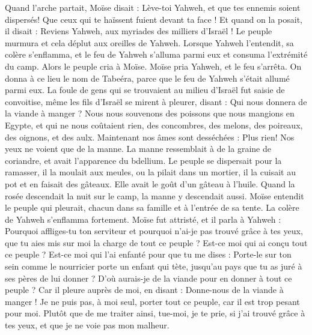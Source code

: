 \begin{multicols}{2}
Quand l'arche partait, Moïse disait : Lève-toi Yahweh, et que tes ennemis soient dispersés! Que ceux qui te haïssent fuient devant ta face !
Et quand on la posait, il disait : Reviens Yahweh, aux myriades des milliers d'Israël !
\VerseOne{}Le peuple murmura et cela déplut aux oreilles de Yahweh. Lorsque Yahweh l'entendit, sa colère s'enflamma, et le feu de Yahweh s'alluma parmi eux et consuma l'extrémité du camp.
Alors le peuple cria à Moïse. Moïse pria Yahweh, et le feu s'arrêta.
On donna à ce lieu le nom de Tabeéra, parce que le feu de Yahweh s'était allumé parmi eux.
La foule de gens qui se trouvaient au milieu d’Israël fut saisie de convoitise, même les fils d'Israël se mirent à pleurer, disant : Qui nous donnera de la viande à manger ?
Nous nous souvenons des poissons que nous mangions en Egypte, et qui ne nous coûtaient rien, des concombres, des melons, des poireaux, des oignons, et des aulx.
Maintenant nos âmes sont desséchées : Plus rien! Nos yeux ne voient que de la manne.
La manne ressemblait à de la graine de coriandre, et avait l’apparence du bdellium.
Le peuple se dispersait pour la ramasser, il la moulait aux meules, ou la pilait dans un mortier, il la cuisait au pot et en faisait des gâteaux. Elle avait le goût d'un gâteau à l'huile.
Quand la rosée descendait la nuit sur le camp, la manne y descendait aussi.
Moïse entendit le peuple qui pleurait, chacun dans sa famille et à l'entrée de sa tente. La colère de Yahweh s’enflamma fortement. Moïse fut attristé,
et il parla à Yahweh : Pourquoi affliges-tu ton serviteur et pourquoi n'ai-je pas trouvé grâce à tes yeux, que tu aies mis sur moi la charge de tout ce peuple ?
Est-ce moi qui ai conçu tout ce peuple ? Est-ce moi qui l’ai enfanté pour que tu me dises : Porte-le sur ton sein comme le nourricier porte un enfant qui tète, jusqu'au pays que tu as juré à ses pères de lui donner ?
D'où aurais-je de la viande pour en donner à tout ce peuple ? Car il pleure auprès de moi, en disant : Donne-nous de la viande à manger !
Je ne puis pas, à moi seul, porter tout ce peuple, car il est trop pesant pour moi.
Plutôt que de me traiter ainsi, tue-moi, je te prie, si j'ai trouvé grâce à tes yeux, et que je ne voie pas mon malheur.
\end{multicols}
